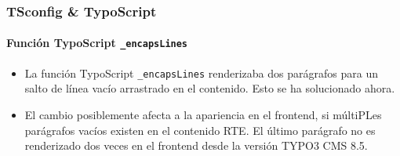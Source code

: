 \begin{frame}[fragile]
	\frametitle{TSconfig \& TypoScript}
	\framesubtitle{Función TypoScript \texttt{\_encapsLines}}

	\begin{itemize}
		\item La función TypoScript \texttt{\_encapsLines} renderizaba dos parágrafos para un
			salto de línea vacío arrastrado en el contenido. Esto se ha solucionado ahora.

		\item El cambio posiblemente afecta a la apariencia en el frontend, si múltiPLes parágrafos vacíos
			existen en el contenido RTE. El último parágrafo no es renderizado dos veces
			en el frontend desde la versión TYPO3 CMS 8.5.

	\end{itemize}

\end{frame}

